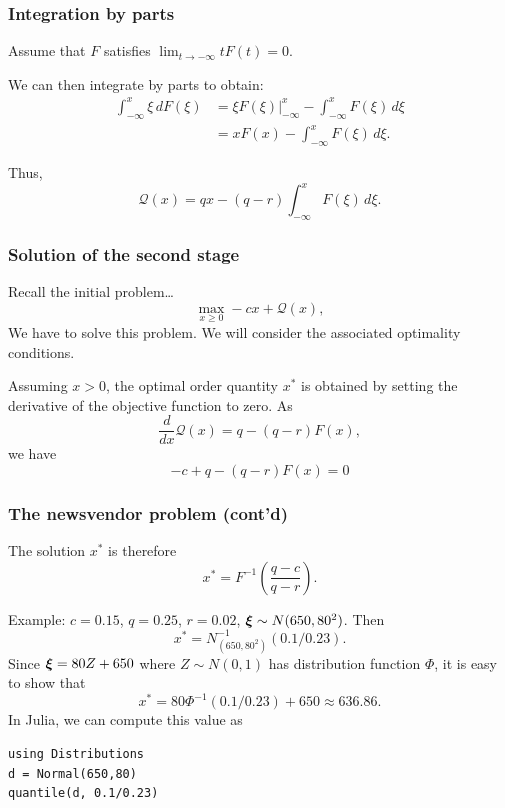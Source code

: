 \documentclass[aspectratio=169]{beamer}
\begin{document}
\begin{frame}
\frametitle{Integration by parts}

Assume that $F$ satisfies $\lim_{t \rightarrow -\infty}
tF(t) = 0$.

\mbox{}

We can then integrate by parts to obtain:
\begin{align*}
\int_{-\infty}^x \xi \, dF(\xi) &= \xi F(\xi) |_{-\infty}^x -
\int_{-\infty}^x F(\xi) \, d\xi \\
&=  xF(x) - \int_{-\infty}^x F(\xi) \, d\xi.
\end{align*}

Thus,
\[
\mathcal{Q}(x) = qx - (q - r)\int_{-\infty}^x F(\xi) \, d\xi.
\]

\end{frame}

\begin{frame}
\frametitle{Solution of the second stage}

Recall the initial problem\ldots
\[
\max_{x \geq 0} -cx + \mathcal{Q}(x),
\]
We have to solve this problem.
We will consider the associated optimality conditions.

\mbox{}

Assuming $x > 0$, the optimal order quantity $x^*$ is obtained by setting the derivative of the objective function to zero.
As
\[
\frac{d}{dx} \mathcal{Q}(x) = q - (q - r)F(x),
\]
we have
\[
-c + q - (q - r)F(x) = 0
\]

\end{frame}

\begin{frame}[fragile]
\frametitle{The newsvendor problem (cont'd)}

The solution $x^*$ is therefore
\[
x^* = F^{-1} \left( \frac{q-c}{q-r} \right).
\]

\mbox{}

Example: $c = 0.15$, $q = 0.25$, $r = 0.02$, ${\boldsymbol{\xi}} \sim N(650, 80^2)$. Then
\[
x^* = N^{-1}_{(650,80^2)}(0.1/0.23).
\]
Since ${\boldsymbol{\xi}} = 80 Z + 650$ where $Z \sim N(0,1)$ has distribution function $\Phi$, it is easy to show that
\[
x^* = 80\Phi^{-1}(0.1/0.23) + 650 \approx 636.86.
\]
In Julia, we can compute this value as
\begin{verbatim}
using Distributions
d = Normal(650,80)
quantile(d, 0.1/0.23)
\end{verbatim}


\end{frame}
\end{document}
